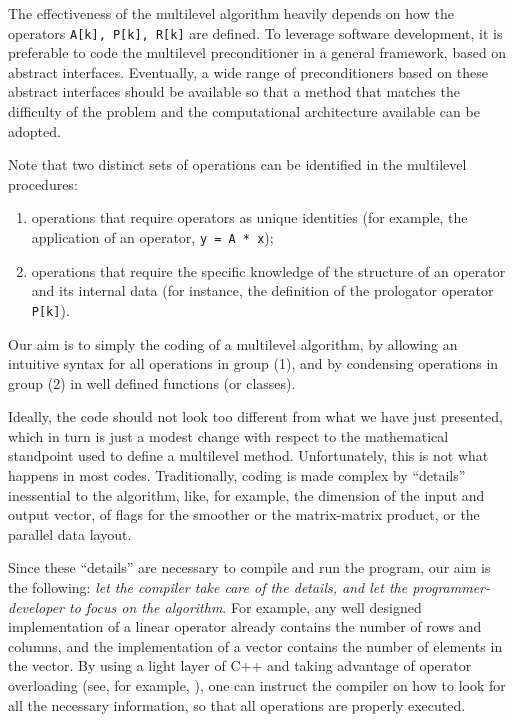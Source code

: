 \documentclass{article}[11pt]
\begin{document}
The effectiveness of the multilevel algorithm heavily depends on 
how the operators \verb!A[k], P[k], R[k]! are defined. To leverage software
development, it is preferable to code the multilevel preconditioner in a
general framework, based on abstract interfaces. Eventually, a  wide range
of preconditioners based on these abstract interfaces should be available so
that a method that matches the difficulty of the problem and the computational
architecture available can be adopted.

\smallskip

Note that two distinct sets of operations can be identified in the multilevel
procedures:
\begin{enumerate}
\item operations that require operators as unique identities (for example,
  the application of an operator, \verb!y = A * x!);
\item operations that require the specific knowledge of the structure
  of an operator and its internal data (for instance, the definition of the
  prologator operator \verb!P[k]!).
\end{enumerate}

Our aim is to simply the coding of a multilevel algorithm, by allowing
an intuitive syntax for all operations in group (1), and by condensing
operations in group (2) in well defined functions (or classes). 

Ideally, the code should not look too different from what we have just
presented, which in turn is just a modest change with respect to the
mathematical standpoint used to define a multilevel method. Unfortunately,
  this is not what happens in most codes.  Traditionally, coding is made
  complex by ``details'' inessential to the algorithm, like, for example, the
  dimension of the input and output vector, of flags for the smoother or the
  matrix-matrix product, or the parallel data layout.

Since these ``details'' are necessary to compile and run the program, our aim
is the following: {\em let the compiler take care of the details, and let the
  programmer-developer to focus on the algorithm}. For example, any well
  designed implementation of a linear operator already contains the number of
  rows and columns, and the implementation of a vector contains the number of
  elements in the vector.  By using a light layer of C++ and taking advantage
  of operator overloading (see, for example, \cite{stroustrup91cpp}), one can
  instruct the compiler on how to look for all the necessary information, so
  that all operations are properly executed.
\end{document}
